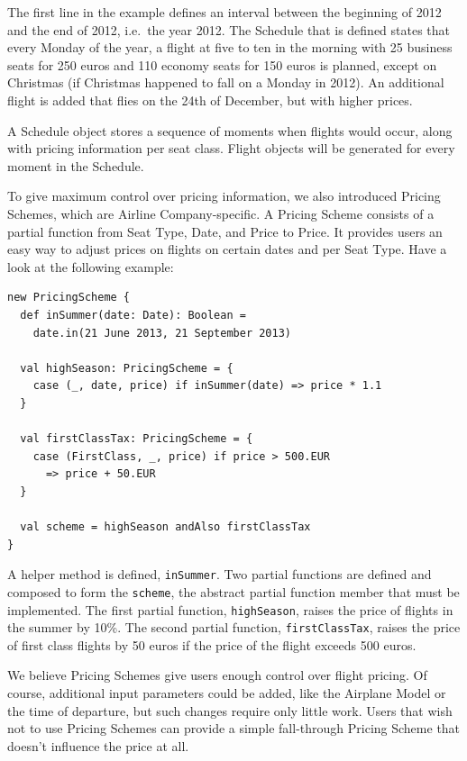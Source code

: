 \documentclass[a4paper]{article}
\renewcommand{\sc}[1]{\lstinline{#1}}
\begin{document}
The first line in the example defines an interval between the beginning of 2012 and the end of 2012, i.e.\ the year 2012.
The Schedule that is defined states that every Monday of the year, a flight at five to ten in the morning with 25 business seats for 250 euros and 110 economy seats for 150 euros is planned, except on Christmas (if Christmas happened to fall on a Monday in 2012).
An additional flight is added that flies on the 24th of December, but with higher prices.

A Schedule object stores a sequence of moments when flights would occur, along with pricing information per seat class.
Flight objects will be generated for every moment in the Schedule.


To give maximum control over pricing information, we also introduced Pricing Schemes, which are Airline Company-specific.
A Pricing Scheme consists of a partial function from Seat Type, Date, and Price to Price.
It provides users an easy way to adjust prices on flights on certain dates and per Seat Type.
Have a look at the following example:

\begin{lstlisting}
new PricingScheme {
  def inSummer(date: Date): Boolean =
    date.in(21 June 2013, 21 September 2013)

  val highSeason: PricingScheme = {
    case (_, date, price) if inSummer(date) => price * 1.1
  }

  val firstClassTax: PricingScheme = {
    case (FirstClass, _, price) if price > 500.EUR
      => price + 50.EUR
  }

  val scheme = highSeason andAlso firstClassTax
}
\end{lstlisting}

A helper method is defined, \sc{inSummer}.
Two partial functions are defined and composed to form the \sc{scheme}, the abstract partial function member that must be implemented.
The first partial function, \sc{highSeason}, raises the price of flights in the summer by 10\%.
The second partial function, \sc{firstClassTax}, raises the price of first class flights by 50 euros if the price of the flight exceeds 500 euros.

We believe Pricing Schemes give users enough control over flight pricing.
Of course, additional input parameters could be added, like the Airplane Model or the time of departure, but such changes require only little work.
Users that wish not to use Pricing Schemes can provide a simple fall-through Pricing Scheme that doesn't influence the price at all.
\end{document}
